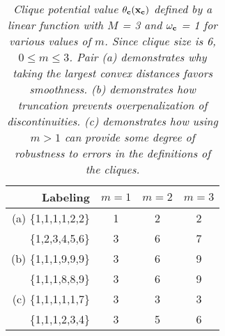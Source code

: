 \documentclass[runningheads]{llncs}
\newcommand{\mycaption}[1]{\vspace{-1mm}\caption{#1}\vspace{-3mm}}
\begin{document}

\begin{table}[h!]
{\mycaption{\footnotesize \em Clique potential value $\theta_{\bf c}({\bf x}_{\bf c})$ defined by a linear function with $M$ = 3 and $\bf{\omega_c}$ = 1 for various
		values of $m$. Since clique size is 6, $0 \leq m \leq 3$. Pair (a)
		demonstrates why taking the largest convex distances favors smoothness. (b) demonstrates how truncation prevents overpenalization of
		discontinuities. (c) demonstrates how using $m > 1$ can provide some degree of robustness to errors in the definitions of the cliques.
}
\label{table:cliqueExample}
}	
{
\begin{tabular}{|r|c|c|c|}
\hline
Labeling & $m=1$ & $m=2$ & $m=3$ \\
\hline
(a) \{1,1,1,1,2,2\} & 1 & 2 & 2 \\
\{1,2,3,4,5,6\} & 3 & 6 & 7 \\
\hline
(b) \{1,1,1,9,9,9\} & 3 & 6 & 9 \\
\{1,1,1,8,8,9\} & 3 & 6 & 9 \\
\hline
(c) \{1,1,1,1,1,7\} & 3 & 3 & 3 \\
\{1,1,1,2,3,4\} & 3 & 5 & 6 \\
\hline
\end{tabular}
}
\end{table}
\end{document}
